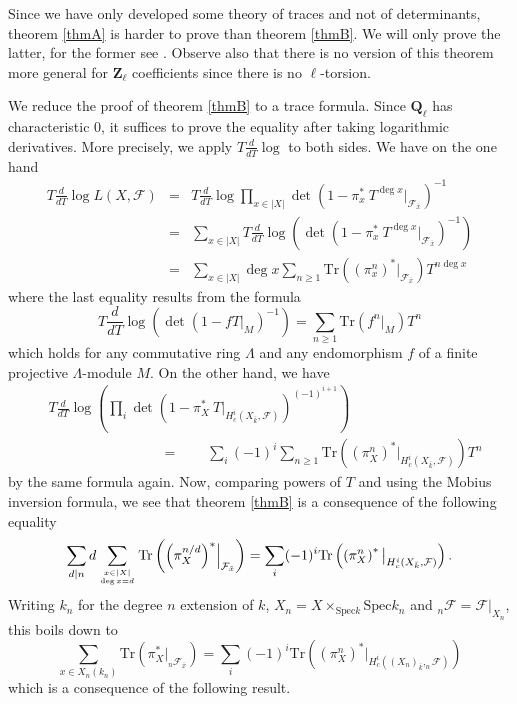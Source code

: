 \begin{remark}
Since we have only developed some theory of traces and not of determinants,
theorem \ref{thmA} is harder to prove than theorem \ref{thmB}. We will only
prove the latter, for the former see \cite{SGA4.5}. Observe also that there is
no version of this theorem more general for $\mathbf{Z}_\ell$ coefficients
since there is no $\ell$-torsion.
\end{remark}

We reduce the proof of theorem \ref{thmB} to a trace formula. Since
$\mathbf{Q}_\ell$ has characteristic 0, it suffices to prove the equality after
taking logarithmic derivatives. More precisely, we apply $T\frac{d}{dT} \log $
to both sides. We have on the one hand
\begin{eqnarray*}
T\frac{d}{dT}\log L(X, \mathcal{F}) & = &
T\frac{d}{dT} \log \prod_{x\in |X|} \det\left(1-\pi_x^*\ T^{\deg
x}\Big|_{\mathcal{F}_{\bar x}}\right)^{-1}\\
& = & \sum_{x\in |X|} T\frac{d}{dT} \log \left( \det\left(1-\pi_x^*\ T^{\deg
x}\Big|_{\mathcal{F}_{\bar x}}\right)^{-1}\right) \\
&= & \sum_{x \in |X|} \deg x\sum_{n \geq 1}
\text{Tr}\left({\left(\pi_x^n\right)}^*\big|_{\mathcal{F}_{\bar x}}\right)
T^{n\deg x}
\end{eqnarray*}
where the last equality results from the formula
$$
T\frac{d}{dT}\log\left(\det\left(1-fT|_M\right)^{-1}\right) = \sum_{n\geq 1}
\text{Tr}(f^n|_M)T^n
$$
which holds for any commutative ring $\Lambda$ and any endomorphism $f$ of a
finite projective $\Lambda$-module $M$. On the other hand, we have
\begin{align*}
&T\frac{d}{dT} \log\left(\prod_i \det\left(1-\pi_X^*\
T\Big|_{H_c^i\left(X_{\bar k} , \mathcal{F}\right)}\right)^{(-1)^{i+1}}\right)
\\
&\qquad\qquad\qquad \qquad = \qquad
\sum_i (-1)^i \sum_{n\geq 1}
\text{Tr}\left({\left(\pi_X^n\right)}^*\big|_{H_c^i(X_{\bar k},
\mathcal{F})}\right) T^n
\end{align*}
by the same formula again. Now, comparing powers of $T$ and using the Mobius
inversion formula, we see that theorem \ref{thmB} is a consequence of the
following equality
$$
\sum_{d | n} d \sum_{x\in |X| \atop \deg x = d} \text{Tr} \left( {\left(
\pi_X^{n/d} \right)}^* \Big|_{\mathcal{F}_{\bar x}} \right)
=
\sum_i (-1)^i \text{Tr}\left(\left(\pi^n_X\right)^*\big|_{H^i_c(X_{\bar k},
\mathcal{F})} \right).
$$
Writing $k_n$ for the degree $n$ extension of $k$, $X_n = X \times_{\text{Spec}
k} \text{Spec} k_n$ and $_n \mathcal{F} = \mathcal{F}|_{X_n}$, this boils down
to
$$
\sum_{x \in X_n(k_n)} \text{Tr}\left( \pi_X^*\big|_{_n\mathcal{F}_{\bar x}}
\right)
=
\sum_i (-1)^i \text{Tr}\left(\left(\pi^n_X\right)^*\big|_{H^i_c({(X_n)}_{\bar
k}, _n\mathcal{F})} \right)
$$
which is a consequence of the following result.


